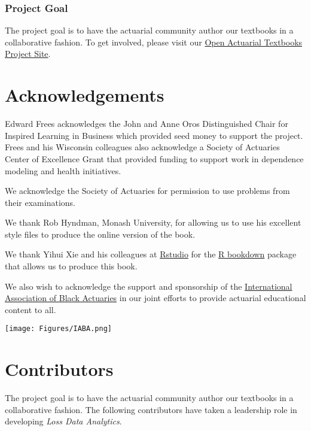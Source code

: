 \documentclass[]{book}
\theoremstyle{definition}
\theoremstyle{definition}
\theoremstyle{definition}
\theoremstyle{remark}
\begin{document}
\subsubsection*{Project Goal}\label{project-goal}

The project goal is to have the actuarial community author our textbooks
in a collaborative fashion. To get involved, please visit our
\href{https://sites.google.com/a/wisc.edu/loss-data-analytics/}{Open
Actuarial Textbooks Project Site}.

\section*{Acknowledgements}\label{acknowledgements}

Edward Frees acknowledges the John and Anne Oros Distinguished Chair for
Inspired Learning in Business which provided seed money to support the
project. Frees and his Wisconsin colleagues also acknowledge a Society
of Actuaries Center of Excellence Grant that provided funding to support
work in dependence modeling and health initiatives.

We acknowledge the Society of Actuaries for permission to use problems
from their examinations.

We thank Rob Hyndman, Monash University, for allowing us to use his
excellent style files to produce the online version of the book.

We thank Yihui Xie and his colleagues at
\href{https://www.rstudio.com/}{Rstudio} for the
\href{https://bookdown.org/yihui/bookdown/}{R bookdown} package that
allows us to produce this book.

We also wish to acknowledge the support and sponsorship of the
\href{http://www.blackactuaries.org/}{International Association of Black
Actuaries} in our joint efforts to provide actuarial educational content
to all.

\texttt{[image: Figures/IABA.png]}

\section*{Contributors}\label{contributors}

The project goal is to have the actuarial community author our textbooks
in a collaborative fashion. The following contributors have taken a
leadership role in developing \emph{Loss Data Analytics}.
\end{document}
